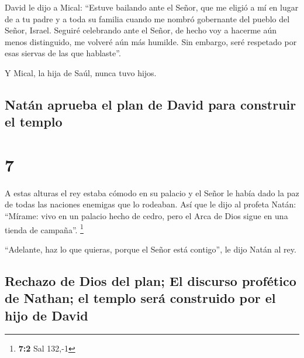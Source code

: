  David le dijo a Mical: ``Estuve bailando ante el Señor,
que me eligió a mí en lugar de a tu padre y a toda su familia cuando me
nombró gobernante del pueblo del Señor, Israel. Seguiré celebrando ante
el Señor,  de hecho voy a hacerme aún menos distinguido,
me volveré aún más humilde. Sin embargo, seré respetado por esas siervas
de las que hablaste''.

 Y Mical, la hija de Saúl, nunca tuvo hijos.

\hypertarget{natuxe1n-aprueba-el-plan-de-david-para-construir-el-templo}{%
\subsection{Natán aprueba el plan de David para construir el
templo}\label{natuxe1n-aprueba-el-plan-de-david-para-construir-el-templo}}

\hypertarget{section-6}{%
\section{7}\label{section-6}}

 A estas alturas el rey estaba cómodo en su palacio y el
Señor le había dado la paz de todas las naciones enemigas que lo
rodeaban.  Así que le dijo al profeta Natán: ``Mírame:
vivo en un palacio hecho de cedro, pero el Arca de Dios sigue en una
tienda de campaña''. \footnote{\textbf{7:2} Sal 132,-1}

 ``Adelante, haz lo que quieras, porque el Señor está
contigo'', le dijo Natán al rey.

\hypertarget{rechazo-de-dios-del-plan-el-discurso-profuxe9tico-de-nathan-el-templo-seruxe1-construido-por-el-hijo-de-david}{%
\subsection{Rechazo de Dios del plan; El discurso profético de Nathan;
el templo será construido por el hijo de
David}\label{rechazo-de-dios-del-plan-el-discurso-profuxe9tico-de-nathan-el-templo-seruxe1-construido-por-el-hijo-de-david}}

